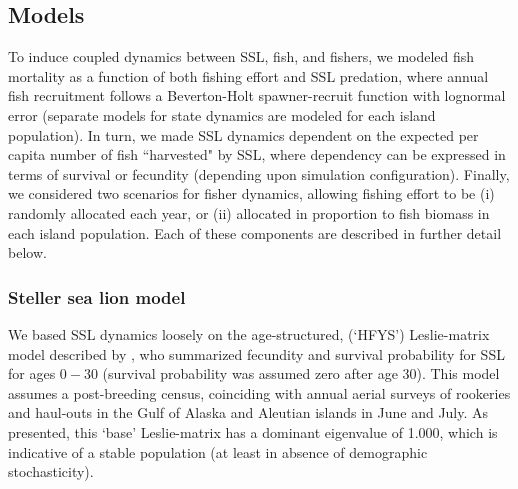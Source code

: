 \documentclass[nonumbib,leqno]{nrc1}
\begin{document}
\subsection{Models}


To induce coupled dynamics between SSL, fish, and fishers, we modeled
fish mortality as a function of both fishing effort and SSL predation, where annual fish recruitment follows a Beverton-Holt spawner-recruit function \citep{Beverton1957} with lognormal error (separate models for state dynamics are modeled for each island population).  In turn, we made SSL dynamics dependent on the expected per capita number of fish ``harvested" by SSL, where dependency can be expressed in terms of survival or fecundity (depending upon simulation configuration).  Finally, we considered two scenarios for fisher dynamics, allowing fishing effort to be (i) randomly allocated each year, or (ii) allocated in proportion to fish biomass in each island population.  Each of these components are described in further detail below.


\subsubsection{Steller sea lion model}

We based SSL dynamics loosely on the age-structured, (`HFYS') Leslie-matrix model described by \citet{HolmesEtAl2007}, who summarized fecundity and survival probability for SSL for ages $0-30$ (survival probability was assumed zero after age 30).  This model assumes a post-breeding census, coinciding with annual aerial surveys of rookeries and haul-outs in the Gulf of Alaska and Aleutian islands in June and July.  As presented, this `base' Leslie-matrix has a dominant eigenvalue of 1.000, which is indicative of a stable population (at least in absence of demographic stochasticity).
\end{document}
